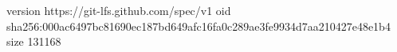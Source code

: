 version https://git-lfs.github.com/spec/v1
oid sha256:000ac6497bc81690ec187bd649afc16fa0c289ae3fe9934d7aa210427e48e1b4
size 131168
